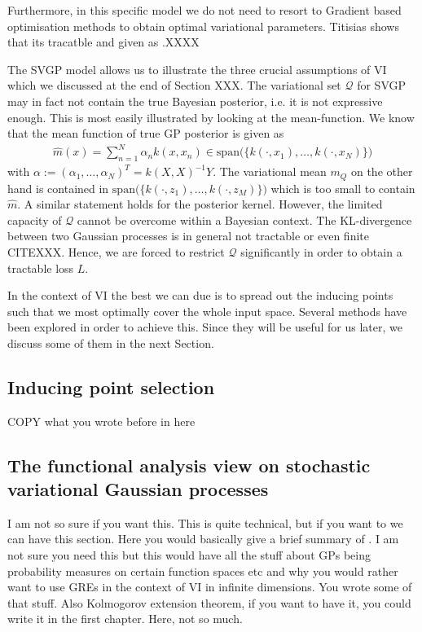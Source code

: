 \documentclass{article}
\newcommand{\calQ}{\mathcal{Q}}
\numberwithin{equation}{section}
\begin{document}
Furthermore, \citet{titsias2009variational} in this specific model we do not need to resort to Gradient based optimisation methods to obtain optimal variational parameters. Titisias shows that its tracatble and given as .XXXX

The SVGP model allows us to illustrate the three crucial assumptions of VI which we discussed at the end of Section XXX. The variational set $\calQ$ for SVGP may in fact not contain the true Bayesian posterior, i.e. it is not expressive enough. This is most easily illustrated by looking at the mean-function. We know that the mean function of true GP posterior is given as 
\begin{align}
    \widehat{m}(x) = \sum_{n=1}^N \alpha_n k(x, x_n)  \in \text{span}\big( \{ k(\cdot, x_1), \hdots, k(\cdot, x_N) \} \big)
\end{align}
with $\alpha :=(\alpha_1, \hdots, \alpha_N)^T = k(X,X)^{-1} Y $. The variational mean $m_Q$ on the other hand is contained in $\text{span}\big( \{ k(\cdot, z_1), \hdots, k(\cdot, z_M) \}\big)$ which is too small to contain $\widehat{m}$. A similar statement holds for the posterior kernel. However, the limited capacity of $\calQ$ cannot be overcome within a Bayesian context. The KL-divergence between two Gaussian processes is in general not tractable or even finite CITEXXX. Hence, we are forced to restrict $\calQ$ significantly in order to obtain a tractable loss $L$. 

In the context of VI the best we can due is to spread out the inducing points such that we most optimally cover the whole input space. Several methods have been explored in order to achieve this. Since they will be useful for us later, we discuss some of them in the next Section.

\subsection{Inducing point selection}

COPY what you wrote before in here

\subsection{The functional analysis view on stochastic variational Gaussian processes}
I am not so sure if you want this. This is quite technical, but if you want to we can have this section. Here you would basically give a brief summary of \citet{wynne2022variational}. I am not sure you need this but this would have all the stuff about GPs being probability measures on certain function spaces etc and why you would rather want to use GREs in the context of VI in infinite dimensions. You wrote some of that stuff. Also Kolmogorov extension theorem, if you want to have it, you could write it in the first chapter. Here, not so much.
\end{document}
